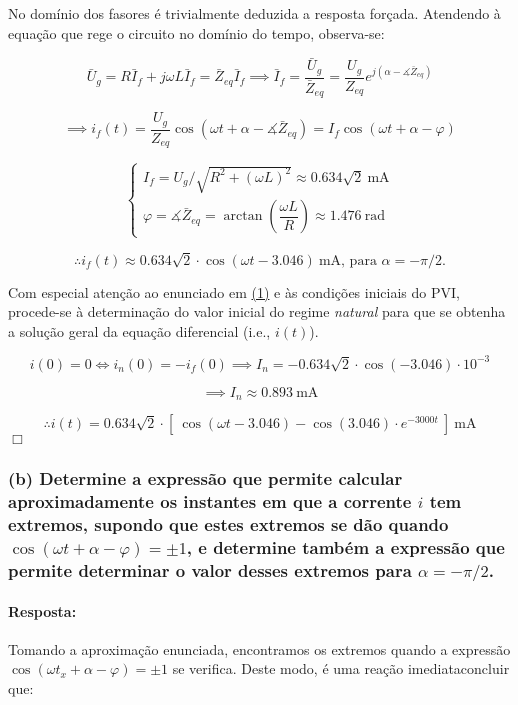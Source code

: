 No domínio dos fasores é trivialmente deduzida a resposta forçada. Atendendo à equação que rege o circuito no domínio do tempo, observa-se:

$$
    \bar{U}_g = R \bar{I}_f + j\omega L \bar{I}_f = \bar{Z}_{eq} \bar{I}_f \implies \bar{I}_f = \frac{\bar{U}_g}{\bar{Z}_{eq}} = \frac{U_g}{Z_{eq}}e^{j(\alpha - \measuredangle \bar{Z}_{eq})}
$$

$$
\implies i_f(t) = \frac{U_g}{Z_{eq}} \cos{(\omega t + \alpha - \measuredangle \bar{Z}_{eq})} = I_f \cos{(\omega t + \alpha - \varphi)}
$$

$$
    \begin{cases}
        I_f = U_g/\sqrt{R^2+(\omega L)^2} \approx 0.634 \sqrt{2}\ \text{mA} \\
        \varphi = \measuredangle \bar{Z}_{eq} = \arctan{(\dfrac{\omega L}{R})} \approx 1.476\ \text{rad}
    \end{cases}
$$

$$
    \therefore i_f(t) \approx 0.634 \sqrt{2}\cdot \cos{(\omega t - 3.046)}\ \text{mA}\text{, para $\alpha = -\pi/2$.}
$$

\clearpage
Com especial atenção ao enunciado em \hyperref[eq1]{(1)} e às condições iniciais do PVI, procede-se à determinação do valor inicial do regime \textit{natural} para que se obtenha a solução geral da equação diferencial (i.e., $i(t)$).

$$
    i(0) = 0 \iff i_n(0) = -i_f(0) \implies I_n = -0.634\sqrt{2}\cdot \cos{(-3.046)} \cdot 10^{-3}
$$

$$
    \implies I_n \approx 0.893\ \text{mA}
$$

$$
    \therefore i(t) = 0.634\sqrt{2}\cdot [\ \cos{(\omega t - 3.046)} - \cos{(3.046)}\cdot e^{-3000t}\ ]\ \text{mA}
$$
\hfill \ensuremath{\Box}
\subsubsection*{(b) Determine a expressão que permite calcular aproximadamente os instantes em que a corrente $i$ tem extremos, supondo que estes extremos se dão quando $\cos{(\omega t + \alpha - \varphi)} = \pm 1$, e
determine também a expressão que permite determinar o valor desses extremos para
$\alpha = -\pi/2$.}
\label{subsubsec_b}
\paragraph{Resposta:}
Tomando a aproximação enunciada, encontramos os extremos quando a expressão $\cos{(\omega t_x + \alpha - \varphi)} = \pm 1$ se verifica. Deste modo, é uma reação imediata\footnotemark concluir que:

